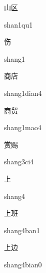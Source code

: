 \begin{verbete}[shan1qu1]{山区}
\begin{pronuncia}{shan1qu1}
\end{pronuncia}
\end{verbete}

\begin{verbete}[shang1]{伤}
\begin{pronuncia}{shang1}
\end{pronuncia}
\end{verbete}

\begin{verbete}{商店}
\begin{pronuncia}{shang1dian4}
\end{pronuncia}
\end{verbete}

\begin{verbete}{商贸}
\begin{pronuncia}{shang1mao4}
\end{pronuncia}
\end{verbete}

\begin{verbete}[shang3ci4]{赏赐}
\begin{pronuncia}{shang3ci4}
\end{pronuncia}
\end{verbete}

\begin{verbete}[shang4]{上}
\begin{pronuncia}{shang4}
\end{pronuncia}
\end{verbete}

\begin{verbete}{上班}
\begin{pronuncia}{shang4ban1}
\end{pronuncia}
\end{verbete}

\begin{verbete}{上边}
\begin{pronuncia}{shang4bian0}
\end{pronuncia}
\end{verbete}

